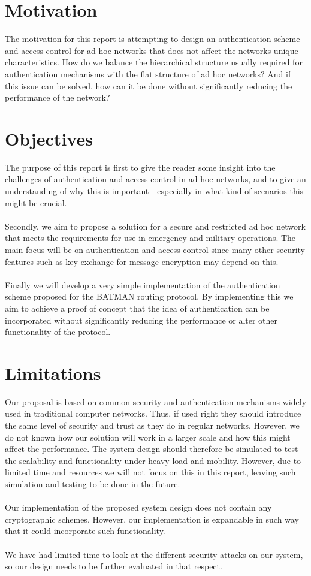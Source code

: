 \section{Motivation}
The motivation for this report is attempting to design an authentication scheme and access control for ad hoc networks that does not affect the networks unique characteristics. How do we balance the hierarchical structure usually required for authentication mechanisms with the flat structure of ad hoc networks? And if this issue can be solved, how can it be done without significantly reducing the performance of the network? 

\section{Objectives}
The purpose of this report is first to give the reader some insight into the challenges of authentication and access control in ad hoc networks, and to give an understanding of why this is important - especially in what kind of scenarios this might be crucial.
\\\\
Secondly, we aim to propose a solution for a secure and restricted ad hoc network that meets the requirements for use in emergency and military operations. The main focus will be on authentication and access control since many other security features such as key exchange for message encryption may depend on this.
\\\\
Finally we will develop a very simple implementation of the authentication scheme proposed for the BATMAN routing protocol. By implementing this we aim to achieve a proof of concept that the idea of authentication can be incorporated without significantly reducing the performance or alter other functionality of the protocol.

\section{Limitations}
Our proposal is based on common security and authentication mechanisms widely used in traditional computer networks. Thus, if used right they should introduce the same level of security and trust as they do in regular networks. However, we do not known how our solution will work in a larger scale and how this might affect the performance. The system design should therefore be simulated to test the scalability and functionality under heavy load and mobility. However, due to limited time and resources we will not focus on this in this report, leaving such simulation and testing to be done in the future.
\\\\
Our implementation of the proposed system design does not contain any cryptographic schemes. However, our implementation is expandable in such way that it could incorporate such functionality.
\\\\
We have had limited time to look at the different security attacks on our system, so our design needs to be further evaluated in that respect.

